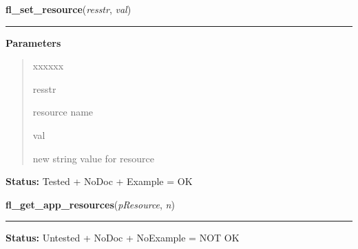     \vspace{0.5ex}

\hspace{.8\funcindent}\begin{boxedminipage}{\funcwidth}

    \raggedright \textbf{fl\_set\_resource}(\textit{resstr}, \textit{val})

    \vspace{-1.5ex}

    \rule{\textwidth}{0.5\fboxrule}
\setlength{\parskip}{2ex}
\setlength{\parskip}{1ex}
      \textbf{Parameters}
      \vspace{-1ex}

      \begin{quote}
        \begin{Ventry}{xxxxxx}

          \item[resstr]

          resource name

          \item[val]

          new string value for resource

        \end{Ventry}

      \end{quote}

\textbf{Status:} Tested + NoDoc + Example = OK



    \end{boxedminipage}

    \label{xformslib:library:fl_get_app_resources}

    \vspace{0.5ex}

\hspace{.8\funcindent}\begin{boxedminipage}{\funcwidth}

    \raggedright \textbf{fl\_get\_app\_resources}(\textit{pResource}, \textit{n})

    \vspace{-1.5ex}

    \rule{\textwidth}{0.5\fboxrule}
\setlength{\parskip}{2ex}
\setlength{\parskip}{1ex}
\textbf{Status:} Untested + NoDoc + NoExample = NOT OK



    \end{boxedminipage}

